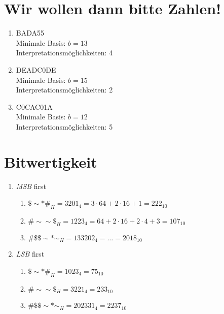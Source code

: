 \documentclass[a4paper]{article}
\begin{document}
\section{Wir wollen dann bitte Zahlen!}
\begin{enumerate}[label=\alph*)]
	\item BADA55 \\
	Minimale Basis:  $b = 13$ \\
	Interpretationsmöglichkeiten: 4


	\item DEADC0DE \\
	Minimale Basis:  $b = 15$ \\
	Interpretationsmöglichkeiten: 2

	\item C0CAC01A \\
	Minimale Basis:  $b = 12$ \\
	Interpretationsmöglichkeiten: 5
\end{enumerate}

\section{Bitwertigkeit}
\begin{enumerate}[label=\alph*)]
    \item \emph{MSB} first
        \begin{enumerate}[label=\Roman*)]
            \item $ \$\sim*\#_H = 3201_4 = 3 \cdot 64 + 2 \cdot 16 + 1 = 222_{10} $

            \item $ \#\sim\sim\$_H = 1223_4 = 64 + 2 \cdot 16 + 2 \cdot 4 + 3 = 107_{10} $

            \item $ \#\$\$\sim*\sim_H = 133202_4 = \dots = 2018_{10} $
        \end{enumerate}

    \item \emph{LSB} first
        \begin{enumerate}[label=\Roman*)]
            \item $ \$\sim*\#_H = 1023_4 = 75_{10} $

            \item $ \#\sim\sim\$_H = 3221_4 = 233_{10} $

            \item $ \#\$\$\sim*\sim_H = 202331_4 = 2237_{10} $
        \end{enumerate}
\end{enumerate}
\end{document}
